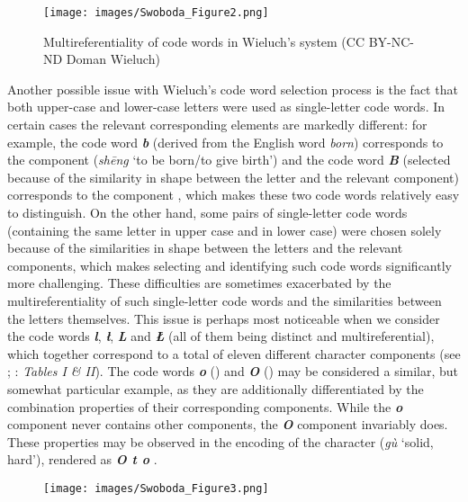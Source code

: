 \documentclass[output=paper,colorlinks,citecolor=brown,arabicfont,chinesefont]{langscibook}
\begin{document}
\begin{figure}
\texttt{[image: images/Swoboda\_Figure2.png]}
\caption{Multireferentiality of code words in Wieluch’s system (CC BY-NC-ND Doman Wieluch)}
\label{swoboda:fig2}
\end{figure}

Another possible issue with Wieluch's code word selection process is the fact that both upper-case and lower-case letters were used as single-letter code words. In certain cases the relevant corresponding elements are markedly different: for example, the code word \textbf{\emph{b}} (derived from the English word \emph{born}) corresponds to the component {} (\emph{shēng} ‘to be born/to give birth’) and the code word \textbf{\emph{B}} (selected because of the similarity in shape between the letter and the relevant component) corresponds to the component {}, which makes these two code words relatively easy to distinguish. On the other hand, some pairs of single-letter code words (containing the same letter in upper case and in lower case) were chosen solely because of the similarities in shape between the letters and the relevant components, which makes selecting and identifying such code words significantly more challenging. These difficulties are sometimes exacerbated by the multireferentiality of such single-letter code words and the similarities between the letters themselves. This issue is perhaps most noticeable when we consider the code words \textbf{\emph{l}}, \textbf{\emph{ł}}, \textbf{\emph{L}} and \textbf{\emph{Ł}} (all of them being distinct and multireferential), which together correspond to a total of eleven different character components (see ; \citealt{Wieluch1936}: \emph{Tables I \& II}). The code words \textbf{\emph{o}} ({}) and \textbf{\emph{O}} ({}) may be considered a similar, but somewhat particular example, as they are additionally differentiated by the combination properties of their corresponding components. While the \textbf{\emph{o}} component never contains other components, the \textbf{\emph{O}} component invariably does. These properties may be observed in the encoding of the character {} (\emph{gù} ‘solid, hard’), rendered as \textbf{\emph{O t o}} \citep[4\textsubscript{p}, 163\textsubscript{d}; see also \textbf{2.4}]{Wieluch1936}.

\begin{figure}
\texttt{[image: images/Swoboda\_Figure3.png]}
\label{swoboda:fig3}
\end{figure}
\end{document}
